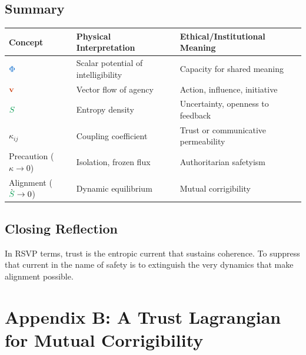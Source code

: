 \documentclass[11pt,a4paper]{article}
\newcommand{\scalar}[1]{\textcolor{scalarcolor}{\ensuremath{#1}}}
\newcommand{\vect}[1]{\textcolor{vectorcolor}{\ensuremath{\mathbf{#1}}}}
\newcommand{\entropy}[1]{\textcolor{entropycolor}{\ensuremath{#1}}}
\theoremstyle{definition}
\theoremstyle{plain}
\begin{document}
\begin{mdframed}[style=appendixbox]
\subsection{Summary}
\begin{center}
\begin{tabular}{lll}
\toprule
\textbf{Concept} & \textbf{Physical Interpretation} & \textbf{Ethical/Institutional Meaning} \\
\midrule
$\scalar{\Phi}$ & Scalar potential of intelligibility & Capacity for shared meaning \\
$\vect{v}$ & Vector flow of agency & Action, influence, initiative \\
$\entropy{S}$ & Entropy density & Uncertainty, openness to feedback \\
$\kappa_{ij}$ & Coupling coefficient & Trust or communicative permeability \\
Precaution ($\kappa \to 0$) & Isolation, frozen flux & Authoritarian safetyism \\
Alignment ($\dot{\entropy{S}} \to 0$) & Dynamic equilibrium & Mutual corrigibility \\
\bottomrule
\end{tabular}
\end{center}

\subsection{Closing Reflection}
In RSVP terms, trust is the entropic current that sustains coherence. To suppress that current in the name of safety is to extinguish the very dynamics that make alignment possible.

\end{mdframed}

\section*{Appendix B: A Trust Lagrangian for Mutual Corrigibility}
\end{document}
